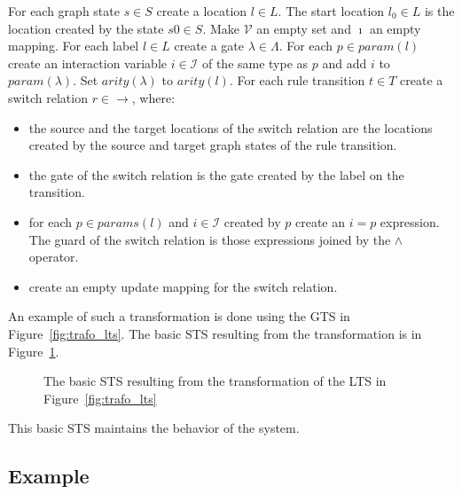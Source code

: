 For each graph state $s \in S$ create a location $l \in L$. The start location $l_0 \in L$ is the location created by the state $s0 \in S$. Make $\mathcal{V}$ an empty set and $\imath$ an empty mapping. For each label $l \in L$ create a gate $\lambda \in \Lambda$. For each $p \in \mathit{param}(l)$ create an interaction variable $i \in \mathcal{I}$ of the same type as $p$ and add $i$ to $param(\lambda)$. Set $\mathit{arity}(\lambda)$ to $\mathit{arity}(l)$. For each rule transition $t \in T$ create a switch relation $r \in \rightarrow$, where:
\begin{itemize}
  \item the source and the target locations of the switch relation are the locations created by the source and target graph states of the rule transition.
  \item the gate of the switch relation is the gate created by the label on the transition.
  \item for each $p \in \mathit{params}(l)$ and $i \in \mathcal{I}$ created by $p$ create an $i = p$ expression. The guard of the switch relation is those expressions joined by the $\land$ operator.
  \item create an empty update mapping for the switch relation.
\end{itemize}

An example of such a transformation is done using the GTS in Figure~\ref{fig:trafo_lts}. The basic STS resulting from the transformation is in Figure~\ref{fig:trafo_basic_sts}.

\begin{figure}[h]
  \begin{center}
    
  \end{center}
  \caption{The basic STS resulting from the transformation of the LTS in Figure~\ref{fig:trafo_lts}}
  \label{fig:trafo_basic_sts}
\end{figure}

This basic STS maintains the behavior of the system.

\subsection{Example}\label{sec:gts_example}
